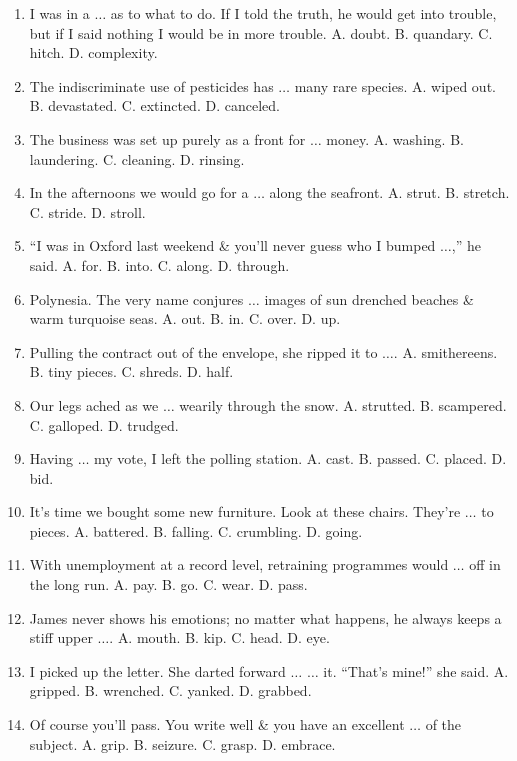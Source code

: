 \documentclass{article}
\numberwithin{equation}{section}
\begin{document}
\begin{enumerate}[leftmargin=8mm]
	\item I was in a $\ldots$ as to what to do. If I told the truth, he would get into trouble, but if I said nothing I would be in more trouble. {\sf A.} doubt. {\sf B.} quandary. {\sf C.} hitch. {\sf D.} complexity.
	\item The indiscriminate use of pesticides has $\ldots$ many rare species. {\sf A.} wiped out. {\sf B.} devastated. {\sf C.} extincted. {\sf D.} canceled.
	\item The business was set up purely as a front for $\ldots$ money. {\sf A.} washing. {\sf B.} laundering. {\sf C.} cleaning. {\sf D.} rinsing.
	\item In the afternoons we would go for a $\ldots$ along the seafront. {\sf A.} strut. {\sf B.} stretch. {\sf C.} stride. {\sf D.} stroll.
	\item ``I was in Oxford last weekend \& you'll never guess who I bumped $\ldots$,'' he said. {\sf A.} for. {\sf B.} into. {\sf C.} along. {\sf D.} through.
	\item Polynesia. The very name conjures $\ldots$ images of sun drenched beaches \& warm turquoise seas. {\sf A.} out. {\sf B.} in. {\sf C.} over. {\sf D.} up.
	\item Pulling the contract out of the envelope, she ripped it to $\ldots$. {\sf A.} smithereens. {\sf B.} tiny pieces. {\sf C.} shreds. {\sf D.} half.
	\item Our legs ached as we $\ldots$ wearily through the snow. {\sf A.} strutted. {\sf B.} scampered. {\sf C.} galloped. {\sf D.} trudged.
	\item Having $\ldots$ my vote, I left the polling station. {\sf A.} cast. {\sf B.} passed. {\sf C.} placed. {\sf D.} bid.
	\item It's time we bought some new furniture. Look at these chairs. They're $\ldots$ to pieces. {\sf A.} battered. {\sf B.} falling. {\sf C.} crumbling. {\sf D.} going.
	\item With unemployment at a record level, retraining programmes would $\ldots$ off in the long run. {\sf A.} pay. {\sf B.} go. {\sf C.} wear. {\sf D.} pass.
	\item James never shows his emotions; no matter what happens, he always keeps a stiff upper $\ldots$. {\sf A.} mouth. {\sf B.} kip. {\sf C.} head. {\sf D.} eye.
	\item I picked up the letter. She darted forward $\ldots$ $\ldots$ it. ``That's mine!'' she said. {\sf A.} gripped. {\sf B.} wrenched. {\sf C.} yanked. {\sf D.} grabbed.
	\item Of course you'll pass. You write well \& you have an excellent $\ldots$ of the subject. {\sf A.} grip. {\sf B.} seizure. {\sf C.} grasp. {\sf D.} embrace.

\end{enumerate}
\end{document}
